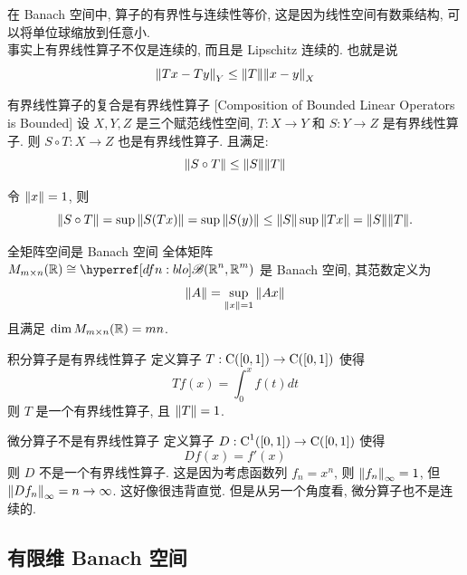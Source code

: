         \begin{rmk}
            [Dedicatia]
            在 Banach 空间中, 算子的有界性与连续性等价, 这是因为线性空间有数乘结构, 可以将单位球缩放到任意小.\\
            事实上有界线性算子不仅是连续的, 而且是 Lipschitz 连续的. 也就是说
            \[\norm{Tx-Ty}_Y\leq\norm{T}\norm{x-y}_X\]
        \end{rmk}

        \begin{thm}
            {有界线性算子的复合是有界线性算子}
            [Composition of Bounded Linear Operators is Bounded]
            设 \(X,Y,Z\) 是三个赋范线性空间, \(T:X\to Y\) 和 \(S:Y\to Z\) 是有界线性算子. 则 \(S\circ T: X\to Z\) 也是有界线性算子. 且满足:
            \[\norm{S\circ T}\leq\norm{S}\norm{T}\]
        \end{thm}

        \begin{prf}
            令 \(\norm{x}=1\), 则
            \[\norm{S\circ T}=\sup\norm{S(T x)}=\sup\norm{S(y)}\leq\norm{S}\sup\norm{T x}=\norm{S}\norm{T}.\]
        \end{prf}

        \begin{ins}
            {全矩阵空间是 Banach 空间}
            全体矩阵 \(M_{m\times n}(\R)\cong\blo(\R^n, \R^m)\) 是 Banach 空间, 其范数定义为
            \[\norm{A}=\sup_{\norm{x}=1}\norm{Ax}\]
            且满足 \(\dim M_{m\times n}(\operatorname{\mathbb{R}})=mn\).
        \end{ins}

        \begin{ins}
            {积分算子是有界线性算子}
            定义算子 \(T:\operatorname{\mathrm{C}}([0,1])\to\operatorname{\mathrm{C}}([0,1])\) 使得
            \[Tf(x)=\int_0^x f(t)dt\]
            则 \(T\) 是一个有界线性算子, 且 \(\norm{T}=1\).
        \end{ins}

        \begin{cxmp}
            {微分算子不是有界线性算子}
            定义算子 \(D:\operatorname{\mathrm{C}}^1([0,1])\to\operatorname{\mathrm{C}}([0,1])\) 使得
            \[Df(x)=f'(x)\]
            则 \(D\) 不是一个有界线性算子. 这是因为考虑函数列 \(f_n=x^n\), 则 \(\norm{f_n}_\infty=1\), 但 \(\norm{Df_n}_\infty=n\to\infty\).
            \tcbline
            这好像很违背直觉. 但是从另一个角度看, 微分算子也不是连续的.
        \end{cxmp}

    \subsection{有限维 Banach 空间}

